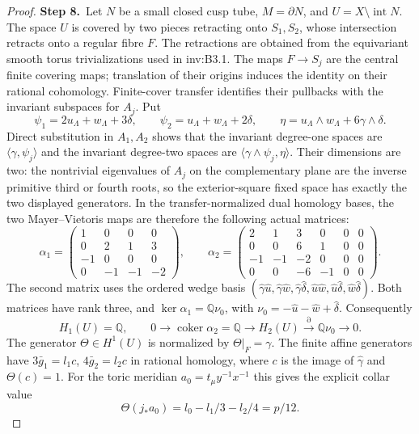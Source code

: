 \documentclass[11pt,a4paper]{article}
\theoremstyle{plain}
\theoremstyle{definition}
\begin{document}
\begin{proof}
\par\smallskip\noindent\textbf{Step 8.}\ Let $N$ be a small closed cusp tube, $M=\partial N$, and
$U=X\setminus\operatorname{int}N$. The space $U$ is covered by
two pieces retracting onto $S_1,S_2$, whose intersection retracts
onto a regular fibre $F$. The retractions are obtained from the
equivariant smooth torus trivializations used in inv:B3.1. The maps
$F\to S_j$ are the central finite covering maps; translation of
their origins induces the identity on their rational cohomology.
Finite-cover transfer identifies their pullbacks with the invariant
subspaces for $A_j$. Put
\[
 \psi_1=2u_{\Lambda}+w_{\Lambda}+3\delta,\qquad \psi_2=u_{\Lambda}+w_{\Lambda}+2\delta,
 \qquad \eta=u_{\Lambda}\wedge w_{\Lambda}+6\gamma\wedge\delta.
\]
Direct substitution in $A_1,A_2$ shows that the invariant
degree-one spaces are $\langle\gamma,\psi_j\rangle$ and the
invariant degree-two spaces are
$\langle\gamma\wedge\psi_j,\eta\rangle$.
Their dimensions are two: the nontrivial eigenvalues of $A_j$ on
the complementary plane are the inverse primitive third or fourth
roots, so the exterior-square fixed space has exactly the two
displayed generators.
In the transfer-normalized dual homology bases, the two
Mayer--Vietoris maps are therefore the following actual matrices:
\[
 \alpha_1=\begin{pmatrix}
 1&0&0&0\\0&2&1&3\\-1&0&0&0\\0&-1&-1&-2
 \end{pmatrix},\qquad
 \alpha_2=\begin{pmatrix}
 2&1&3&0&0&0\\0&0&6&1&0&0\\
 -1&-1&-2&0&0&0\\0&0&-6&-1&0&0
 \end{pmatrix}.
\]
The second matrix uses the ordered wedge basis
$(\hat\gamma\hat u,\hat\gamma\hat w,\hat\gamma\hat\delta,
\hat u\hat w,\hat u\hat\delta,\hat w\hat\delta)$.
Both matrices have rank three, and
$\ker\alpha_1=\mathbb Q\nu_0$, with
$\nu_0=-\hat u-\hat w+\hat\delta$.
Consequently
\[
 H_1(U)=\mathbb Q,\qquad
 0\longrightarrow\operatorname{coker}\alpha_2=\mathbb Q
 \longrightarrow H_2(U)
 \xrightarrow{\partial}\mathbb Q\nu_0\longrightarrow0.       \tag{B.1}
\]
The generator $\Theta\in H^1(U)$ is normalized by
$\Theta|_F=\gamma$. The finite affine generators have
$3\bar g_1=l_1c$, $4\bar g_2=l_2c$ in rational homology, where
$c$ is the image of $\hat\gamma$ and $\Theta(c)=1$.
For the toric meridian $a_0=t_\mu y^{-1}x^{-1}$ this gives the
explicit collar value
\[
 \Theta(j_*a_0)=l_0-l_1/3-l_2/4=p/12.                 \tag{B.2}
\]


\end{proof}
\end{document}
